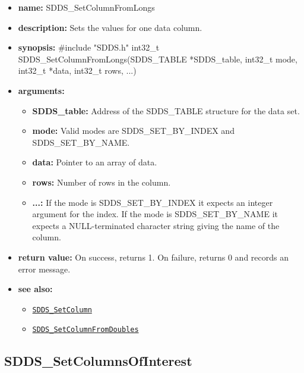 \documentclass[11pt]{article}
\newcommand{\progref}[1]{\hyperref[SDDS_#1]{\tt SDDS\_#1}}
\begin{document}
\begin{itemize}
\item {\bf name:}\newline
SDDS\_SetColumnFromLongs
\item {\bf description:}\newline
Sets the values for one data column.
\item {\bf synopsis:} \#include "SDDS.h"\newline
int32\_t SDDS\_SetColumnFromLongs(SDDS\_TABLE *SDDS\_table, int32\_t mode, int32\_t *data, int32\_t rows, ...)
\item {\bf arguments:}
\begin{itemize}
\item {\bf SDDS\_table:} Address of the SDDS\_TABLE structure for the data set.
\item {\bf mode:} Valid modes are SDDS\_SET\_BY\_INDEX and SDDS\_SET\_BY\_NAME.
\item {\bf data:} Pointer to an array of data.
\item {\bf rows:} Number of rows in the column.
\item {\bf ...:} If the mode is SDDS\_SET\_BY\_INDEX it expects an integer argument for the index. If the mode is SDDS\_SET\_BY\_NAME it expects a NULL-terminated character string giving the name of the column.
\end{itemize}
\item {\bf return value:}\newline
On success, returns 1. On failure, returns 0 and records an error message.
\item {\bf see also:}
\begin{itemize}
\item \progref{SetColumn}
\item \progref{SetColumnFromDoubles}
\end{itemize}
\end{itemize}

\subsection{SDDS\_SetColumnsOfInterest}
\label{SDDS_SetColumnsOfInterest}
\end{document}
